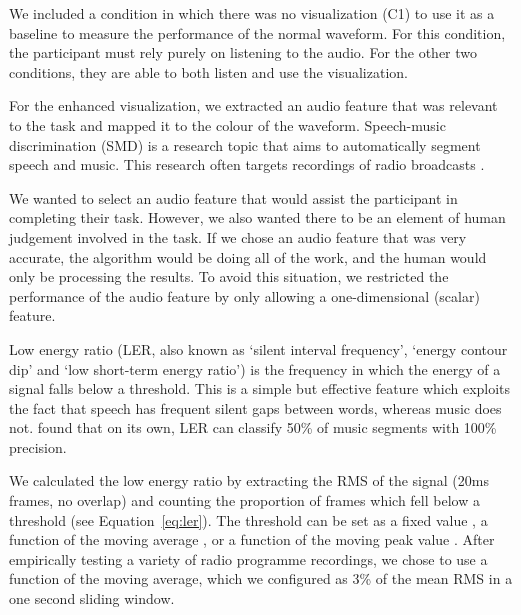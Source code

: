We included a condition in which there was no visualization (C1) to use it as a baseline to measure the performance of
the normal waveform. For this condition, the participant must rely purely on listening to the audio.  For the other two
conditions, they are able to both listen and use the visualization.

For the enhanced visualization, we extracted an audio feature that was relevant to the task and mapped it to the colour
of the waveform.
Speech-music discrimination (SMD) is a research topic that aims to automatically segment speech and music.  This
research often targets recordings of radio broadcasts
\citep{Goodwin2004,Wieser2014,Saunders1996,Pikrakis2008,Pikrakis2006a}.

We wanted to select an audio feature that would assist the participant in completing their task.  However, we also
wanted there to be an element of human judgement involved in the task. If we chose an audio feature that was very
accurate, the algorithm would be doing all of the work, and the human would only be processing the results.  To avoid
this situation, we restricted the performance of the audio feature by only allowing a one-dimensional (scalar) feature.

Low energy ratio (LER, also known as `silent interval frequency', `energy contour dip' and `low short-term energy
ratio') is the frequency in which the energy of a signal falls below a threshold. This is a simple but effective
feature which exploits the fact that speech has frequent silent gaps between words, whereas music does not.
\citet{Panagiotakis2005} found that on its own, LER can classify 50\% of music segments with 100\% precision.

We calculated the low energy ratio by extracting the RMS of the signal (20ms frames, no overlap) and counting the proportion
of frames which fell below a threshold (see Equation~\ref{eq:ler}).  The threshold can be set as a fixed value
\citep{Liang2005,Panagiotakis2005}, a function of the moving average \citep{Ericsson2009}, or a function of the moving
peak value \citep{Saunders1996}.  After empirically testing a variety of radio programme recordings, we chose to use a
function of the moving average, which we configured as 3\% of the mean RMS in a one second sliding window.

